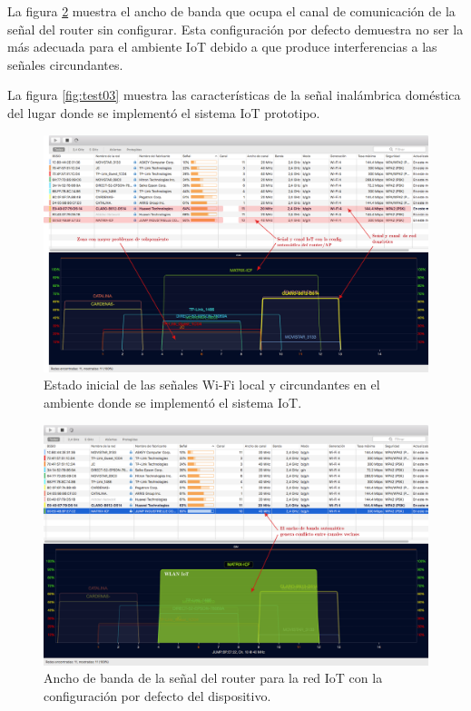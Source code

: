La figura \ref{fig:test02} muestra el ancho de banda que ocupa el canal de comunicación de la señal del router sin configurar. Esta configuración por defecto demuestra no ser la más adecuada para el ambiente IoT debido a que produce interferencias a las señales circundantes.

La figura \ref{fig:test03} muestra las características de la señal inalámbrica doméstica del lugar donde se implementó el sistema IoT prototipo.


\begin{landscape} %
\begin{figure}[htpb]
\centering 
\includegraphics[width=1.5\textwidth]{./Figures/wifi/01.png}
\caption{Estado inicial de las señales Wi-Fi local y circundantes en el ambiente donde se implementó el sistema IoT.}
\label{fig:test01}
\end{figure}
\end{landscape} %


\begin{landscape} %
\begin{figure}[htpb]
\centering 
\includegraphics[width=1.5\textwidth]{./Figures/wifi/02.png}
\caption{Ancho de banda de la señal del router para la red IoT con la configuración por defecto del dispositivo.}
\label{fig:test02}
\end{figure}
\end{landscape} %


